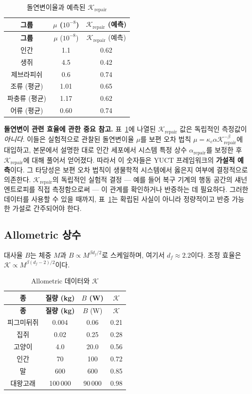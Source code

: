 \documentclass[12pt,a4paper]{article}
\newcommand{\REL}{\mathcal{K}}          %
\begin{document}
	\begin{longtable}{|c|c|c|}
		\caption{돌연변이율과 예측된 \(\REL_{\mathrm{repair}}\)}\label{tab:mutations}\\
		\hline
		\textbf{그룹} & \(\mu\) (\(10^{-8}\)) & \(\REL_{\mathrm{repair}}\) (예측) \\
		\hline
		\endfirsthead
		\hline
		\textbf{그룹} & \(\mu\) (\(10^{-8}\)) & \(\REL_{\mathrm{repair}}\) (예측) \\
		\hline
		\endhead
		\hline
		인간 & 1.1 & 0.62 \\
		생쥐 & 4.5 & 0.42 \\
		제브라피쉬 & 0.6 & 0.74 \\
		조류 (평균) & 1.01 & 0.65 \\
		파충류 (평균) & 1.17 & 0.62 \\
		어류 (평균) & 0.60 & 0.74 \\
		\hline
	\end{longtable}
	
	\noindent\textbf{돌연변이 관련 효율에 관한 중요 참고.}
	표~\ref{tab:mutations}에 나열된 \(\REL_{\mathrm{repair}}\) 값은 독립적인 측정값이 \emph{아니다}.
	이들은 실험적으로 관찰된 돌연변이율 \(\mu\)를 보편 오차 법칙 \(\mu = \kappa_c \alpha \REL_{\mathrm{repair}}^{-\beta}\)에 대입하고, 본문에서 설명한 대로 인간 세포에서 시스템 특정 상수 \(\alpha_{\mathrm{repair}}\)를 보정한 후 \(\REL_{\mathrm{repair}}\)에 대해 풀어서 얻어졌다.
	따라서 이 숫자들은 YUCT 프레임워크의 \textbf{가설적 예측}이다.
	그 타당성은 보편 오차 법칙이 생물학적 시스템에서 옳은지 여부에 결정적으로 의존한다.
	\(\REL_{\mathrm{repair}}\)의 독립적인 실험적 결정 — 예를 들어 복구 기계의 행동 공간의 섀넌 엔트로피를 직접 측정함으로써 — 이 관계를 확인하거나 반증하는 데 필요하다.
	그러한 데이터를 사용할 수 있을 때까지, 표~\ref{tab:mutations}는 확립된 사실이 아니라 정량적이고 반증 가능한 가설로 간주되어야 한다.
	
	\subsection{Allometric 상수}
	\label{sec:allometry}
	대사율 \(B\)는 체중 \(M\)과 \(B\propto M^{\beta d_f/2}\)로 스케일하며, 여기서 \(d_f\approx2.2\)이다. 조정 효율은 \(\REL \propto M^{\beta(d_f-2)/2}\)이다.
	
	\begin{longtable}{|c|c|c|c|}
		\caption{Allometric 데이터와 \(\REL\)}\label{tab:allometry}\\
		\hline
		\textbf{종} & \textbf{질량 (kg)} & \(B\) (W) & \(\REL\) \\
		\hline
		\endfirsthead
		\hline
		\textbf{종} & \textbf{질량 (kg)} & \(B\) (W) & \(\REL\) \\
		\hline
		\endhead
		\hline
		피그미뒤쥐 & 0.004 & 0.06 & 0.21 \\
		집쥐 & 0.02 & 0.25 & 0.28 \\
		고양이 & 4.0 & 20.0 & 0.56 \\
		인간 & 70 & 100 & 0.72 \\
		말 & 600 & 600 & 0.85 \\
		대왕고래 & 100\,000 & 90\,000 & 0.98 \\
		\hline
	\end{longtable}
	
\end{document}
